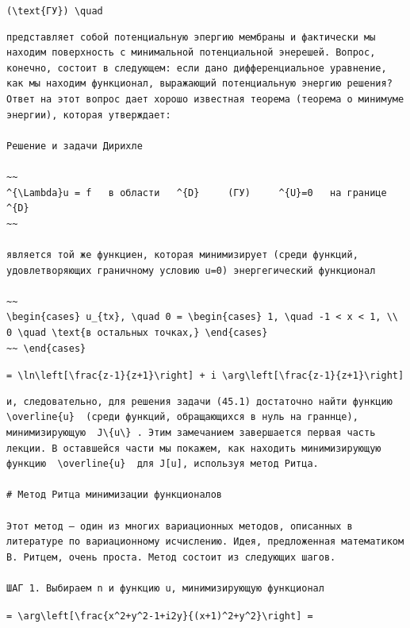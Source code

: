 \documentclass[
  ukrainian,
]{article}
\begin{document}
\texttt{(\textbackslash{}text\{ГУ\})\ \textbackslash{}quad}

\begin{verbatim}
представляет собой потенциальную эпергию мембраны и фактически мы находим поверхность с минимальной потенциальной энерешей. Вопрос, конечно, состоит в следующем: если дано дифференциальное уравнение, как мы находим функционал, выражающий потенциальную энергию решения? Ответ на этот вопрос дает хорошо известная теорема (теорема о минимуме энергии), которая утверждает:

Решение и задачи Дирихле

~~
^{\Lambda}u = f   в области   ^{D}     (ГУ)     ^{U}=0   на границе   ^{D}
~~

является той же функциен, которая минимизирует (среди функций, удовлетворяющих граничному условию u=0) энергегический функционал

~~
\begin{cases} u_{tx}, \quad 0 = \begin{cases} 1, \quad -1 < x < 1, \\ 0 \quad \text{в остальных точках,} \end{cases}
~~ \end{cases}
\end{verbatim}

\texttt{=\ \textbackslash{}ln\textbackslash{}left{[}\textbackslash{}frac\{z-1\}\{z+1\}\textbackslash{}right{]}\ +\ i\ \textbackslash{}arg\textbackslash{}left{[}\textbackslash{}frac\{z-1\}\{z+1\}\textbackslash{}right{]}}

\begin{verbatim}
и, следовательно, для решения задачи (45.1) достаточно найти функцию  \overline{u}  (среди функций, обращающихся в нуль на граннце), минимизирующую  J\{u\} . Этим замечанием завершается первая часть лекции. В оставшейся части мы покажем, как находить минимизирующую функцию  \overline{u}  для J[u], используя метод Ритца.

# Метод Ритца минимизации функционалов

Этот метод — один из многих вариационных методов, описанных в литературе по вариационному исчислению. Идея, предложенная математиком В. Ритцем, очень проста. Метод состоит из следующих шагов.

ШАГ 1. Выбираем n и функцию u, минимизирующую функционал
\end{verbatim}

\texttt{=\ \textbackslash{}arg\textbackslash{}left{[}\textbackslash{}frac\{x\^{}2+y\^{}2-1+i2y\}\{(x+1)\^{}2+y\^{}2\}\textbackslash{}right{]}\ =}
\end{document}
